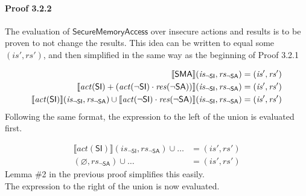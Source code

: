 \documentclass[12pt, letterpaper]{article}
\let\emptyset\varnothing
\newcommand\interp[1]{\llbracket #1 \rrbracket}
\begin{document}
 \paragraph{Proof 3.2.2}
     The evaluation of $\mathsf{SecureMemoryAccess}$ over insecure actions and results is to be proven to not change the results.  This idea can be written to equal some $(\mathit{is}', \mathit{rs}')$, and then simplified in the same way as the beginning of Proof 3.2.1
 \par\nobreak
 {\small
 \begin{align}
     \setcounter{equation}{0}
     \interp{ \mathsf{SMA} } (\mathit{is_{\mathsf{\neg SI}}}, \mathit{rs_{\mathsf{\neg SA}}})
     &=
     (\mathit{is}', \mathit{rs}')
     \\
     \interp{ \mathit{act}(\mathsf{SI}) +
     (\mathit{act}(\neg\mathsf{SI}) \cdot
      \mathit{res}(\neg\mathsf{SA}))  } (\mathit{is_{\mathsf{\neg SI}}}, \mathit{rs_{\mathsf{\neg SA}}})
     &=
     (\mathit{is}', \mathit{rs}')
     \\
     \interp{ \mathit{act}(\mathsf{SI}) } (\mathit{is_{\mathsf{\neg SI}}}, \mathit{rs_{\mathsf{\neg SA}}}) \cup %
     \interp{ \mathit{act}(\neg\mathsf{SI}) \cdot
      \mathit{res}(\neg\mathsf{SA}) } (\mathit{is_{\mathsf{\neg SI}}}, \mathit{rs_{\mathsf{\neg SA}}})
     &=
     (\mathit{is}', \mathit{rs}')
 \end{align}
 }
     Following the same format, the expression to the left of the union is evaluated first.
 \par\nobreak
 {\small
 \begin{align}
     \interp{ \mathit{act}(\mathsf{SI}) } (\mathit{is_{\mathsf{\neg SI}}}, \mathit{rs_{\mathsf{\neg SA}}}) \cup \ldots
     &=
     (\mathit{is}', \mathit{rs}')
     \\
     (\emptyset, \mathit{rs_{\mathsf{\neg SA}}}) \cup \ldots
     &=
     (\mathit{is}', \mathit{rs}')
 \end{align}
 }
     Lemma \#2 in the previous proof simplifies this easily.\\
     The expression to the right of the union is now evaluated.
 \par\nobreak
\end{document}
